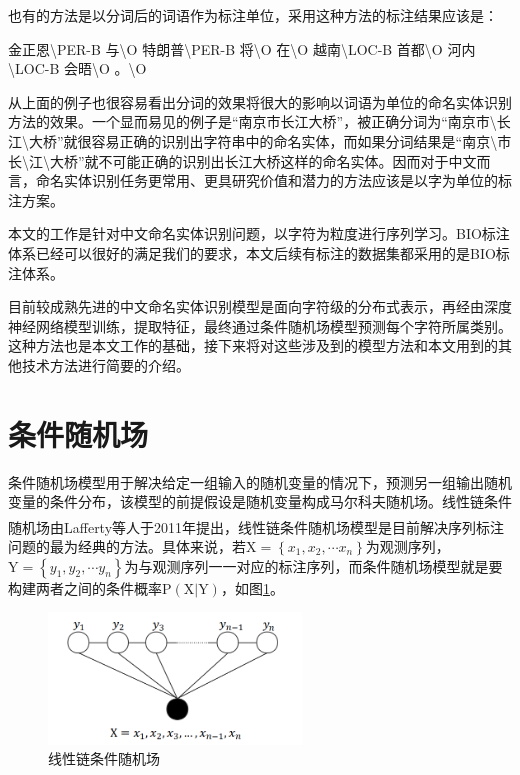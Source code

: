 \documentclass[winfonts,master,oneside,nobackinfo]{njuthesis}
\newcommand{\upcite}[1]{\textsuperscript{\textsuperscript{\cite{#1}}}}
\begin{document}
也有的方法是以分词后的词语作为标注单位，采用这种方法的标注结果应该是：

金正恩\textbackslash PER-B 与\textbackslash O 特朗普\textbackslash PER-B 将\textbackslash O 在\textbackslash O 越南\textbackslash LOC-B 首都\textbackslash O 河内\textbackslash LOC-B 会晤\textbackslash O 。\textbackslash O

从上面的例子也很容易看出分词的效果将很大的影响以词语为单位的命名实体识别方法的效果。一个显而易见的例子是“南京市长江大桥”，被正确分词为“南京市\textbackslash 长江\textbackslash 大桥”就很容易正确的识别出字符串中的命名实体，而如果分词结果是“南京\textbackslash 市长\textbackslash 江\textbackslash 大桥”就不可能正确的识别出长江大桥这样的命名实体。因而对于中文而言，命名实体识别任务更常用、更具研究价值和潜力的方法应该是以字为单位的标注方案。

本文的工作是针对中文命名实体识别问题，以字符为粒度进行序列学习。BIO标注体系已经可以很好的满足我们的要求，本文后续有标注的数据集都采用的是BIO标注体系。

目前较成熟先进的中文命名实体识别模型是面向字符级的分布式表示，再经由深度神经网络模型训练，提取特征，最终通过条件随机场模型预测每个字符所属类别。这种方法也是本文工作的基础，接下来将对这些涉及到的模型方法和本文用到的其他技术方法进行简要的介绍。

\section{条件随机场}
条件随机场模型用于解决给定一组输入的随机变量的情况下，预测另一组输出随机变量的条件分布，该模型的前提假设是随机变量构成马尔科夫随机场。线性链条件随机场由Lafferty等人\upcite{Lafferty}于2011年提出，线性链条件随机场模型是目前解决序列标注问题的最为经典的方法。具体来说，若$\mathrm { X } = \left\{ x _ { 1 } , x _ { 2 } , \cdots x _ { n } \right\}$为观测序列，$\mathrm { Y } = \left\{ y _ { 1 } , y _ { 2 } ,  \cdots y _ { n } \right\}$为与观测序列一一对应的标注序列，而条件随机场模型就是要构建两者之间的条件概率$\mathrm { P } ( \mathrm { X } | \mathrm { Y } )$，如图\ref{crf}。

\begin{figure}[h]
\centering
\includegraphics[width=0.6\textwidth]{./figure/线性链条件随机场.jpg}
\caption{线性链条件随机场}
\label{crf}
\end{figure}
\end{document}
